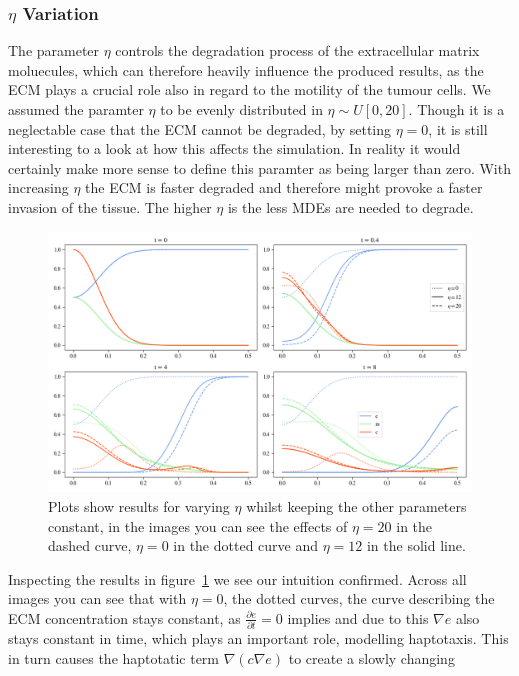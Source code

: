 \subsubsection*{$\eta$ Variation}
The parameter $\eta$ controls the degradation process of the extracellular matrix moluecules, which can therefore heavily influence the produced results, as the ECM plays a crucial role also in regard to the motility of the tumour cells. We assumed the paramter $\eta$ to be evenly distributed in $\eta \sim U[0, 20]$. Though it is a neglectable case that the ECM cannot be degraded, by setting $\eta=0$, it is still interesting to a look at how this affects the simulation. In reality it would certainly make more sense to define this paramter as being larger than zero. \newline 
With increasing $\eta$ the ECM is faster degraded and therefore might provoke a faster invasion of the tissue. The higher $\eta$ is the less MDEs are needed to degrade.\newline
\begin{figure}[h]
    \centering
    \includegraphics[width=\textwidth]{resources/images/eta_variation.png}
    \caption{Plots show results for varying $\eta$ whilst keeping the other parameters constant, in the images you can see the effects of $\eta=20$ in the dashed curve, $\eta=0$ in the dotted curve and $\eta=12$ in the solid line.}
    \label{fig:eta_variation}
\end{figure}
Inspecting the results in figure~\ref{fig:eta_variation} we see our intuition confirmed. Across all images you can see that with $\eta=0$, the dotted curves, the curve describing the ECM concentration stays constant, as $\frac{\partial e}{\partial t} = 0$ implies and due to this $\nabla e$ also stays constant in time, which plays an important role, modelling haptotaxis. This in turn causes the haptotatic term $\nabla ( c \nabla e)$ to create a slowly changing 

